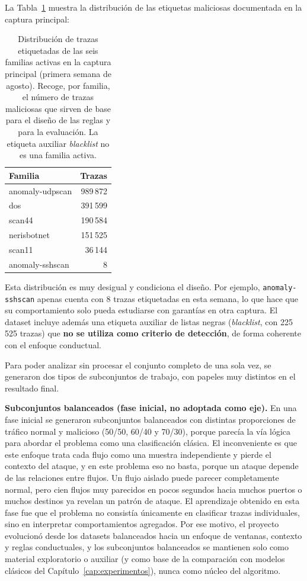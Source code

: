 La Tabla~\ref{tab:distribucion_familias} muestra la distribución de las etiquetas maliciosas documentada en la captura principal:

\begin{table}[ht]
\centering
\small
\begin{tabular}{|l|r|}
\hline
\textbf{Familia} & \textbf{Trazas} \\
\hline
anomaly-udpscan & 989\,872 \\
\hline
dos & 391\,599 \\
\hline
scan44 & 190\,584 \\
\hline
nerisbotnet & 151\,525 \\
\hline
scan11 & 36\,144 \\
\hline
anomaly-sshscan & 8 \\
\hline
\end{tabular}
\caption{Distribución de trazas etiquetadas de las seis familias activas en la captura principal (primera semana de agosto). Recoge, por familia, el número de trazas maliciosas que sirven de base para el diseño de las reglas y para la evaluación. La etiqueta auxiliar \emph{blacklist} no es una familia activa.}
\label{tab:distribucion_familias}
\end{table}

Esta distribución es muy desigual y condiciona el diseño. Por ejemplo, \texttt{anomaly-sshscan} apenas cuenta con 8 trazas etiquetadas en esta semana, lo que hace que su comportamiento solo pueda estudiarse con garantías en otra captura. El dataset incluye además una etiqueta auxiliar de listas negras (\emph{blacklist}, con 225\,525 trazas) que \textbf{no se utiliza como criterio de detección}, de forma coherente con el enfoque conductual.

Para poder analizar sin procesar el conjunto completo de una sola vez, se generaron dos tipos de subconjuntos de trabajo, con papeles muy distintos en el resultado final.

\textbf{Subconjuntos balanceados (fase inicial, no adoptada como eje).} En una fase inicial se generaron subconjuntos balanceados con distintas proporciones de tráfico normal y malicioso (50/50, 60/40 y 70/30), porque parecía la vía lógica para abordar el problema como una clasificación clásica. El inconveniente es que este enfoque trata cada flujo como una muestra independiente y pierde el contexto del ataque, y en este problema eso no basta, porque un ataque depende de las relaciones entre flujos. Un flujo aislado puede parecer completamente normal, pero cien flujos muy parecidos en pocos segundos hacia muchos puertos o muchos destinos ya revelan un patrón de ataque. El aprendizaje obtenido en esta fase fue que el problema no consistía únicamente en clasificar trazas individuales, sino en interpretar comportamientos agregados. Por ese motivo, el proyecto evolucionó desde los datasets balanceados hacia un enfoque de ventanas, contexto y reglas conductuales, y los subconjuntos balanceados se mantienen solo como material exploratorio o auxiliar (y como base de la comparación con modelos clásicos del Capítulo~\ref{cap:experimentos}), nunca como núcleo del algoritmo.

